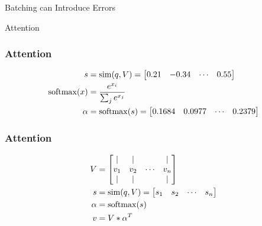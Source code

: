 \documentclass{beamer}
\newcommand{\softmax}{\mathop{\rm softmax}\nolimits}
\newcommand{\similar}{\mathop{\rm sim}\nolimits}
\begin{document}
\begin{section}{Batching can Introduce Errors}
\begin{subsection}{Attention}
        \begin{frame}
            \frametitle{Attention}
            \begin{align*}
                s &= \similar(q, V) = \begin{bmatrix}
                        0.21 & -0.34 & \cdots & 0.55 \\
                    \end{bmatrix} \\
                \softmax(x) &= \frac{e^{x_i}}{\sum_j e^{x_j}} \\
                \alpha &= \softmax(s) = \begin{bmatrix}
                        0.1684 & 0.0977 & \cdots & 0.2379 \\
                    \end{bmatrix} \\
            \end{align*}
        \end{frame}

        \begin{frame}
            \frametitle{Attention}
            \begin{align*}
                V &= \begin{bmatrix}
                         \vert & \vert & & \vert \\
                         v_1 & v_2 & \cdots & v_n \\
                         \vert & \vert & & \vert
                     \end{bmatrix} \\
                s &= \similar(q, V) = \begin{bmatrix}
                        s_1 & s_2 & \cdots & s_n \\
                    \end{bmatrix} \\
                \alpha &= \softmax(s) \\
                v &= V * \alpha^{T} \\
            \end{align*}
        \end{frame}


\end{subsection}
\end{section}
\end{document}
